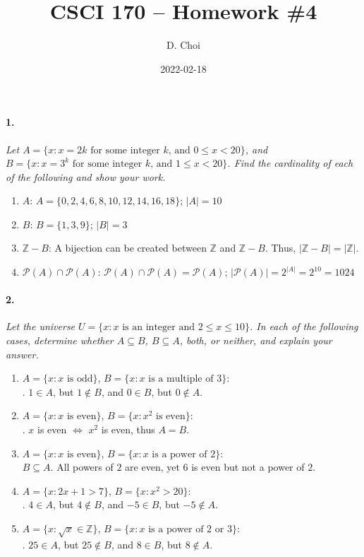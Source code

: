 \documentclass[12pt]{article}
\title{CSCI 170 -- Homework \#4}
\author{D. Choi}
\date{2022-02-18}
\begin{document}
\maketitle

\paragraph{1.}
{\itshape
    Let $A = \{x : x = 2k \text{ for some integer $k$, and } 0 \leq x < 20\}$, and
    $B = \{x : x = 3^k \text{ for some integer $k$, and } 1 \leq x < 20\}$. Find the cardinality of
    each of the following and show your work.
}
\begin{enumerate}[label=\textbf{\alph*.}]
    \item $A$: $A = \{0, 2, 4, 6, 8, 10, 12, 14, 16, 18\}$; $\boxed{|A| = 10}$
    \item $B$: $B = \{1, 3, 9\}$; $\boxed{|B| = 3}$
    \item $\mathbb{Z} - B$: A bijection can be created between $\mathbb{Z}$ and $\mathbb{Z} - B$.
    Thus, $\boxed{|\mathbb{Z} - B| = |\mathbb{Z}|}$.
    \item $\mathcal{P}(A) \cap \mathcal{P}(A)$:
    $\mathcal{P}(A) \cap \mathcal{P}(A) = \mathcal{P}(A)$;
    $|\mathcal{P}(A)| = 2^{|A|} = 2^{10} = \boxed{1024}$
\end{enumerate}

\paragraph{2.}
{\itshape
    Let the universe $U = \{x : x \text{ is an integer and } 2 \leq x \leq 10\}$. In each of the
    following cases, determine whether $A \subseteq B$, $B \subseteq A$, both, or neither, and
    explain your answer.
}
\begin{enumerate}[label=\textbf{\alph*.}]
    \item $A = \{x : x \text{ is odd}\}$, $B = \{x: x \text{ is a multiple of }3\}$: \\
    . $1 \in A$, but $1 \notin B$, and $0 \in B$, but $0 \notin A$.
    \item $A = \{x : x \text{ is even}\}$, $B = \{x: x^2 \text{ is even}\}$: \\
    . $x$ is even $\iff$ $x^2$ is even, thus $A = B$.
    \item $A = \{x : x \text{ is even}\}$, $B = \{x: x \text{ is a power of }2\}$: \\
    $\boxed{B \subseteq A}$. All powers of $2$ are even, yet $6$ is even but not a power of $2$.
    \item $A = \{x : 2x + 1 > 7\}$, $B = \{x: x^2 > 20\}$: \\
    . $4 \in A$, but $4 \notin B$, and $-5 \in B$, but $-5 \notin A$.
    \item $A = \{x : \sqrt{x} \in \mathbb{Z}\}$,
    $B = \{x: x \text{ is a power of }2 \text{ or } 3\}$: \\
    . $25 \in A$, but $25 \notin B$, and $8 \in B$, but $8 \notin A$.
\end{enumerate}
\end{document}
